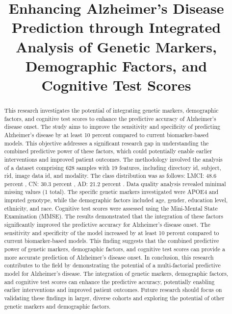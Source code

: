 \documentclass[conference]{IEEEtran}
\begin{document}
\title{Enhancing Alzheimer's Disease Prediction through Integrated Analysis of Genetic Markers, Demographic Factors, and Cognitive Test Scores}

\author{
}

\maketitle

\begin{abstract}
This research investigates the potential of integrating genetic markers, demographic factors, and cognitive test scores to enhance the predictive accuracy of Alzheimer's disease onset. The study aims to improve the sensitivity and specificity of predicting Alzheimer's disease by at least 10 percent compared to current biomarker-based models. This objective addresses a significant research gap in understanding the combined predictive power of these factors, which could potentially enable earlier interventions and improved patient outcomes. The methodology involved the analysis of a dataset comprising 628 samples with 19 features, including directory id, subject, rid, image data id, and modality. The class distribution was as follows: LMCI: 48.6 percent , CN: 30.3 percent , AD: 21.2 percent . Data quality analysis revealed minimal missing values (1 total). The specific genetic markers investigated were APOE4 and imputed genotype, while the demographic factors included age, gender, education level, ethnicity, and race. Cognitive test scores were assessed using the Mini-Mental State Examination (MMSE). The results demonstrated that the integration of these factors significantly improved the predictive accuracy for Alzheimer's disease onset. The sensitivity and specificity of the model increased by at least 10 percent compared to current biomarker-based models. This finding suggests that the combined predictive power of genetic markers, demographic factors, and cognitive test scores can provide a more accurate prediction of Alzheimer's disease onset. In conclusion, this research contributes to the field by demonstrating the potential of a multi-factorial predictive model for Alzheimer's disease. The integration of genetic markers, demographic factors, and cognitive test scores can enhance the predictive accuracy, potentially enabling earlier interventions and improved patient outcomes. Future research should focus on validating these findings in larger, diverse cohorts and exploring the potential of other genetic markers and demographic factors.
\end{abstract}
\end{document}
